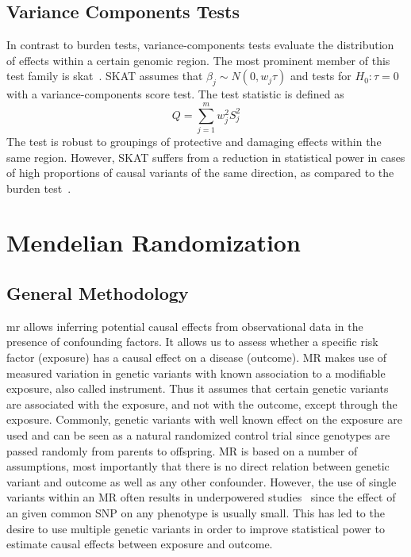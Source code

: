\subsection{Variance Components Tests}
\label{sub:variance_component_tests}
In contrast to burden tests, variance-components tests evaluate the distribution of effects within a certain genomic region.
The most prominent member of this test family is \acrfull{skat}~\cite{Wu2011}.
SKAT assumes that $\beta_j\sim N(0,w_j\tau)$ and tests for $H_0: \tau = 0$ with a variance-components score test.
The test statistic is defined as
\begin{equation}\label{eq:skat}
  Q = \sum^{m}_{j=1} w_{j}^2 S_{j}^2
\end{equation}
The test is robust to groupings of protective and damaging effects within the same region.
However,  SKAT suffers from a reduction in statistical power in cases of high proportions of causal variants of the same direction, as compared to the burden test~\cite{Derkach2013a}.

\section{Mendelian Randomization}
\label{sec:joint_association_study}

\subsection{General Methodology}
\label{sub:General_Methedology}

\acrfull{mr} allows  inferring potential causal effects from observational data in the presence of confounding factors. 
It allows us to assess whether a specific risk factor (exposure) has a causal effect on a disease (outcome).
MR makes use of measured variation in genetic variants with known association to a modifiable exposure, also called instrument.
Thus it assumes that certain genetic variants are associated with the exposure, and not with the outcome, except through the exposure.
Commonly, genetic variants with well known effect on the exposure are used and can be seen as a natural randomized control trial since genotypes are passed randomly from parents to offspring.
MR is based on a number of assumptions, most importantly that there is no direct relation between genetic variant and outcome as well as any other confounder.
However, the use of single variants within an MR often results in underpowered studies~\cite{Bowden2015} since the effect of an given common SNP on any phenotype is usually small.
This has led to the desire to use multiple genetic variants in order to improve statistical power to estimate causal effects between exposure and outcome.

